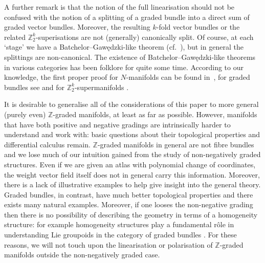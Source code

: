 \documentclass[pdftex]{sigma}
\numberwithin{equation}{section}
\begin{document}
A further remark is that the notion of the full linearisation should not be confused with the notion of a splitting of a graded bundle into a direct sum of graded vector bundles. Moreover, the resulting $k$-fold vector bundles or the related $\mathbb{Z}_{2}^{k}$-superisations are not (generally) canonically split. Of course, at each `stage' we have a Batchelor--Gaw\k{e}dzki-like theorem (cf.~\cite{Batchelor:1979,Gawedzki:1977}), but in general the splittings are non-canonical. The existence of Batchelor--Gaw\k{e}dzki-like theorems in various categories has been folklore for quite some time. According to our knowledge, the f\/irst proper proof for $N$-manifolds can be found in~\cite{Bonavolonta:2013}, for graded bundles see \cite{Bruce:2014} and for $\mathbb{Z}_{2}^{k}$-supermanifolds \cite{Covolo:2014b}.

It is desirable to generalise all of the considerations of this paper to more general (purely even) $\mathbb{Z}$-graded manifolds, at least as far as possible. However, manifolds that have both positive and negative gradings are intrinsically harder to understand and work with: basic questions about their topological properties and dif\/ferential calculus remain. $\mathbb{Z}$-graded manifolds in general are not f\/ibre bundles and we lose much of our intuition gained from the study of non-negatively graded structures. Even if we are given an atlas with polynomial change of coordinates, the weight vector f\/ield itself does not in general carry this information. Moreover, there is a lack of illustrative examples to help give insight into the general theory. Graded bundles, in contrast, have much better topological properties and there exists many natural examples. Moreover, if one looses the non-negative grading then there is no possibility of describing the geometry in terms of a homogeneity structure: for example homogeneity structures play a fundamental r\^ole in understanding Lie groupoids in the category of graded bundles \cite{Bruce:2014c}. For these reasons, we will not touch upon the linearisation or polarisation of $\mathbb{Z}$-graded manifolds outside the non-negatively graded case.
\end{document}
